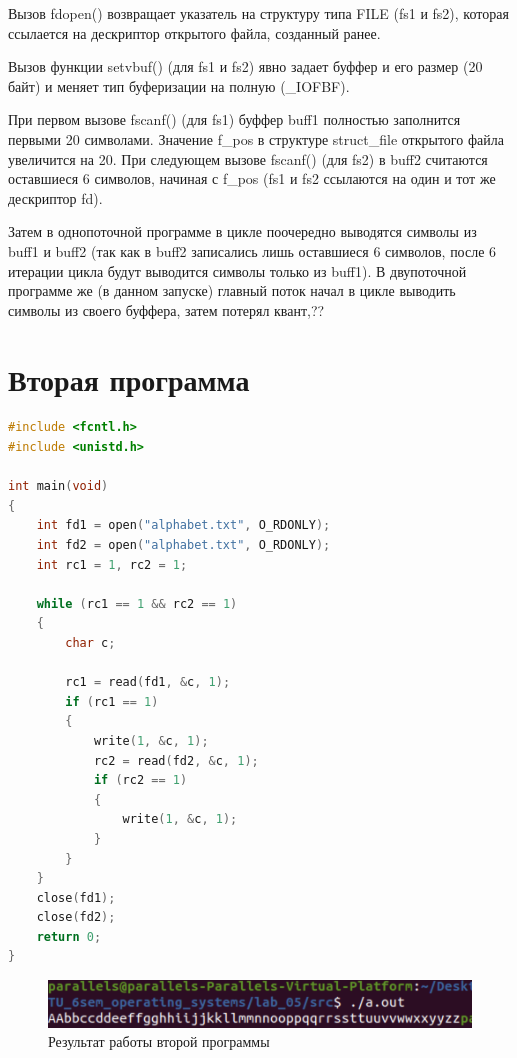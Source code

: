 \documentclass[12pt]{report}
\begin{document}
Вызов fdopen() возвращает указатель на структуру типа FILE (fs1 и fs2), которая ссылается на дескриптор открытого файла, созданный ранее. 
	
Вызов функции setvbuf() (для fs1 и fs2)  явно задает буффер и его размер (20 байт) и меняет тип буферизации на полную (\_IOFBF).

При первом вызове fscanf()  (для fs1) буффер buff1 полностью заполнится первыми 20 символами. Значение f\_pos в структуре struct\_file открытого файла увеличится на 20. При следующем вызове fscanf() (для fs2) в buff2 считаются оставшиеся 6 символов, начиная с f\_pos (fs1 и fs2 ссылаются на один и тот же дескриптор fd).


Затем в однопоточной программе в цикле поочередно выводятся символы из buff1 и buff2 (так как в buff2 записались лишь оставшиеся 6 символов, после 6 итерации цикла будут выводится символы только из buff1). В двупоточной программе же (в данном запуске) главный поток начал в цикле выводить символы из своего буффера, затем потерял квант,??




\chapter{Вторая программа}

\begin{lstlisting}[language=c, label=p2, caption=Вторая программа]
#include <fcntl.h>
#include <unistd.h>

int main(void)
{
    int fd1 = open("alphabet.txt", O_RDONLY);
    int fd2 = open("alphabet.txt", O_RDONLY);
    int rc1 = 1, rc2 = 1;

    while (rc1 == 1 && rc2 == 1)
    {
        char c;

        rc1 = read(fd1, &c, 1);
        if (rc1 == 1)
        {
            write(1, &c, 1);
            rc2 = read(fd2, &c, 1);
            if (rc2 == 1)
            {
                write(1, &c, 1);
            }
        }
    }
    close(fd1);
    close(fd2);
    return 0;
}
\end{lstlisting}

\begin{figure}[H]
	\centering
	\includegraphics[scale=0.9]{img/prog_02.png}
	\caption{Результат работы второй программы}
	\label{fig:prog_02}
\end{figure}
\end{document}
